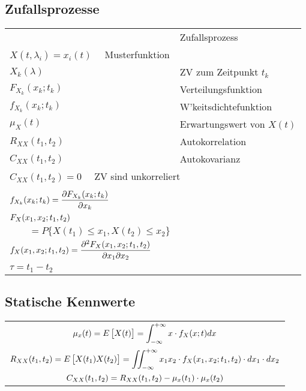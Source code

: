 \documentclass[a4paper]{article}
\begin{document}
\begin{twocolumn}
\section{Zufallsprozesse}
\begin{definition}
\begin{tabularx}{\columnwidth}{XX}
    \begin{tabular}{ll}
      $X(t, \lambda)$ & Zufallsprozess \\ 
      \multicolumn{2}{l}{$X(t,\lambda_i) = x_i(t) \quad$ Musterfunktion} \\
      $X_k(\lambda)$ & ZV zum Zeitpunkt $t_k$ \\
      $F_{X_k}(x_k;t_k)$ & Verteilungsfunktion \\
      $f_{X_k}(x_k;t_k)$ & W'keitsdichtefunktion \\
      $\mu_X(t)$ & Erwartungswert von $X(t)$\\
      $R_{XX}(t_1,t_2)$ & Autokorrelation \\
      $C_{XX}(t_1,t_2)$ & Autokovarianz \\
      \multicolumn{2}{l}{$C_{XX}(t_1,t_2) = 0\quad$ ZV sind unkorreliert}  \\
    \end{tabular}&
    \begin{tabular}{l}
      $\fmm F_{X_k}(x_k;t_k) = P \{ X_k(t_k) \leq x_k \}$ \\
      $\displaystyle f_{X_k}(x_k;t_k) = \frac{\partial F_{X_k}(x_k;t_k)}{\partial x_k}$ \\
      $\displaystyle F_X(x_1, x_2;t_1, t_2) $ \\
      $ \qquad = P \{X(t_1) \leq x_1, X(t_2) \leq x_2 \}$ \\
      $\displaystyle f_X(x_1,x_2;t_1,t_2) = \frac{\partial^2 F_X(x_1,x_2;t_1,t_2)}{\partial x_1
      \partial x_2}$\\ 
      $\tau = t_1 - t_2$
    \end{tabular}
\end{tabularx}
\end{definition} 

\subsection{Statische Kennwerte}

\begin{tabular}{c}
  $\displaystyle \mu_x(t) = E \left[X(t) \right] = \int_{-\infty}^{+\infty} x \cdot f_X(x;t) dx$ \\
  $\displaystyle R_{XX}(t_1,t_2) = E \left[ X(t_1)X(t_2) \right] = \iint_{-\infty}^{+\infty} x_1 x_2 \cdot
  f_X(x_1,x_2;t_1,t_2) \cdot dx_1 \cdot dx_2$ \\
  $\displaystyle C_{XX}(t_1,t_2) = R_{XX}(t_1, t_2) - \mu_x(t_1) \cdot \mu_x(t_2)$ \\
\end{tabular} 


\end{twocolumn}
\end{document}
